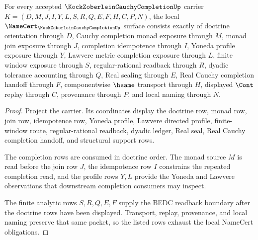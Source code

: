 \begin{theorem}
\label{thm:kock-zoberlein-cauchy-completion-namecert-obligations}
For every accepted $\KockZoberleinCauchyCompletionUp$ carrier $K=(D,M,J,I,Y,L,S,R,Q,E,F,H,C,P,N)$, the local $\NameCert_{\KockZoberleinCauchyCompletionUp}$ surface consists exactly of doctrine orientation through $D$, Cauchy completion monad exposure through $M$, monad join exposure through $J$, completion idempotence through $I$, Yoneda profile exposure through $Y$, Lawvere metric completion exposure through $L$, finite window exposure through $S$, regular-rational readback through $R$, dyadic tolerance accounting through $Q$, Real sealing through $E$, Real Cauchy completion handoff through $F$, componentwise $\hsame$ transport through $H$, displayed $\Cont$ replay through $C$, provenance through $P$, and local naming through $N$.
\end{theorem}
\begin{proof}
Project the carrier. Its coordinates display the doctrine row, monad row, join row, idempotence row, Yoneda profile, Lawvere directed profile, finite-window route, regular-rational readback, dyadic ledger, Real seal, Real Cauchy completion handoff, and structural support rows.

The completion rows are consumed in doctrine order. The monad source $M$ is read before the join row $J$, the idempotence row $I$ constrains the repeated completion read, and the profile rows $Y,L$ provide the Yoneda and Lawvere observations that downstream completion consumers may inspect.

The finite analytic rows $S,R,Q,E,F$ supply the BEDC readback boundary after the doctrine rows have been displayed. Transport, replay, provenance, and local naming preserve that same packet, so the listed rows exhaust the local NameCert obligations.
\end{proof}

